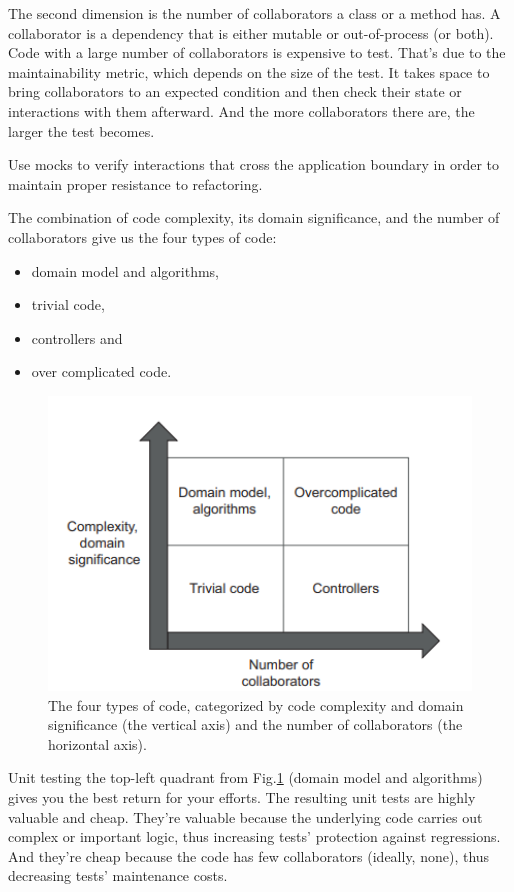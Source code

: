 \documentclass{article}
\begin{document}
The second dimension is the number of collaborators a class or a method has. A collaborator is a dependency that is either mutable or out-of-process (or both). Code with a large number of collaborators is expensive to test. That’s due to the maintainability metric, which depends on the size of the test. It takes space to bring collaborators to an expected condition and then check their state or interactions with them afterward. And the more collaborators there are, the larger the test becomes.

Use mocks to verify interactions that cross the application boundary in order to maintain proper resistance to refactoring. 

The combination of code complexity, its domain significance, and the number of collaborators give us the four types of code:
\begin{itemize}
	\item domain model and algorithms,
	\item trivial code,
	\item controllers and
	\item over complicated code.	
\end{itemize}

\begin{figure}[H]
  \centering
  \includegraphics[width=1.0\textwidth]{img/code_types}
  \caption{The four types of code, categorized by code complexity and domain significance (the vertical axis) and the number of collaborators (the horizontal axis).}
  \label{fig:four_code_types}
\end{figure}

Unit testing the top-left quadrant from Fig.\ref{fig:four_code_types} (domain model and algorithms) gives you the best return for your efforts. The resulting unit tests are highly valuable and cheap. They’re valuable because the underlying code carries out complex or important logic, thus increasing tests’ protection against regressions. And they’re cheap because the code has few collaborators (ideally, none), thus decreasing tests’ maintenance costs.
\end{document}
